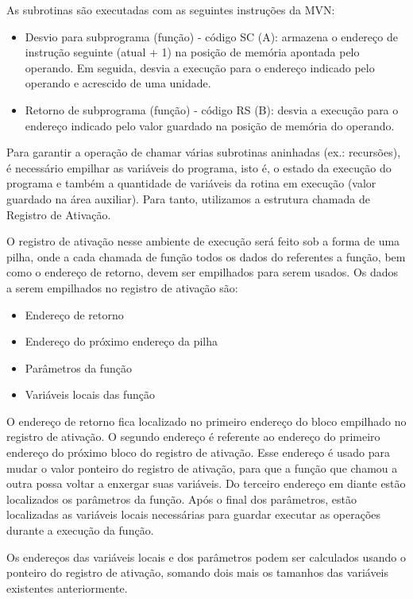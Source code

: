 As subrotinas são executadas com as seguintes instruções da MVN:

\begin{itemize}
	\item Desvio para subprograma (função) - código SC (A): armazena o endereço de instrução seguinte (atual + 1)  na posição de memória apontada pelo operando. Em seguida, desvia a execução para o endereço indicado pelo operando e acrescido de uma unidade.
	\item Retorno de subprograma (função) - código RS (B): desvia a execução para o endereço indicado pelo valor guardado na posição de memória do operando.
\end{itemize}

Para garantir a operação de chamar várias subrotinas aninhadas (ex.: recursões), é necessário empilhar as variáveis do programa, isto é, o estado da execução do programa e também a quantidade de variáveis da rotina em execução (valor guardado na área auxiliar). Para tanto, utilizamos a estrutura chamada de Registro de Ativação.


O registro de ativação nesse ambiente de execução será feito sob a forma de uma pilha, onde a cada chamada de função todos os dados do referentes a função, bem como o endereço de retorno, devem ser empilhados para serem usados. Os dados a serem empilhados no registro de ativação são:

\begin{itemize}
	\item Endereço de retorno
	\item Endereço do próximo endereço da pilha
	\item Parâmetros da função
	\item Variáveis locais das função
\end{itemize}

O endereço de retorno fica localizado no primeiro endereço do bloco empilhado no registro de ativação. O segundo endereço é referente ao endereço do primeiro endereço do próximo bloco do registro de ativação. Esse endereço é usado para mudar o valor ponteiro do registro de ativação, para que a função que chamou a outra possa voltar a enxergar suas variáveis. Do terceiro endereço em diante estão localizados os parâmetros da função. Após o final dos parâmetros, estão localizadas as variáveis locais necessárias para guardar executar as operações durante a execução da função.


Os endereços das variáveis locais e dos parâmetros podem ser calculados usando o ponteiro do registro de ativação, somando dois mais os tamanhos das variáveis existentes anteriormente.


